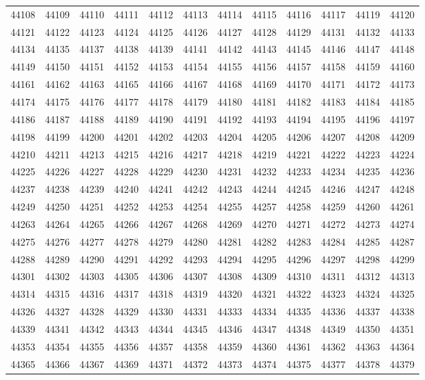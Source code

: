 \begin{center}
\begin{longtable}{llllllllllll}
44108 &44109 &44110 &44111 &44112 &44113 &44114 &44115 &44116 &44117 &44119 &44120 \\
44121 &44122 &44123 &44124 &44125 &44126 &44127 &44128 &44129 &44131 &44132 &44133 \\
44134 &44135 &44137 &44138 &44139 &44141 &44142 &44143 &44145 &44146 &44147 &44148 \\
44149 &44150 &44151 &44152 &44153 &44154 &44155 &44156 &44157 &44158 &44159 &44160 \\
44161 &44162 &44163 &44165 &44166 &44167 &44168 &44169 &44170 &44171 &44172 &44173 \\
44174 &44175 &44176 &44177 &44178 &44179 &44180 &44181 &44182 &44183 &44184 &44185 \\
44186 &44187 &44188 &44189 &44190 &44191 &44192 &44193 &44194 &44195 &44196 &44197 \\
44198 &44199 &44200 &44201 &44202 &44203 &44204 &44205 &44206 &44207 &44208 &44209 \\
44210 &44211 &44213 &44215 &44216 &44217 &44218 &44219 &44221 &44222 &44223 &44224 \\
44225 &44226 &44227 &44228 &44229 &44230 &44231 &44232 &44233 &44234 &44235 &44236 \\
44237 &44238 &44239 &44240 &44241 &44242 &44243 &44244 &44245 &44246 &44247 &44248 \\
44249 &44250 &44251 &44252 &44253 &44254 &44255 &44257 &44258 &44259 &44260 &44261 \\
44263 &44264 &44265 &44266 &44267 &44268 &44269 &44270 &44271 &44272 &44273 &44274 \\
44275 &44276 &44277 &44278 &44279 &44280 &44281 &44282 &44283 &44284 &44285 &44287 \\
44288 &44289 &44290 &44291 &44292 &44293 &44294 &44295 &44296 &44297 &44298 &44299 \\
44301 &44302 &44303 &44305 &44306 &44307 &44308 &44309 &44310 &44311 &44312 &44313 \\
44314 &44315 &44316 &44317 &44318 &44319 &44320 &44321 &44322 &44323 &44324 &44325 \\
44326 &44327 &44328 &44329 &44330 &44331 &44333 &44334 &44335 &44336 &44337 &44338 \\
44339 &44341 &44342 &44343 &44344 &44345 &44346 &44347 &44348 &44349 &44350 &44351 \\
44353 &44354 &44355 &44356 &44357 &44358 &44359 &44360 &44361 &44362 &44363 &44364 \\
44365 &44366 &44367 &44369 &44371 &44372 &44373 &44374 &44375 &44377 &44378 &44379 \\

\end{longtable}
\end{center}

